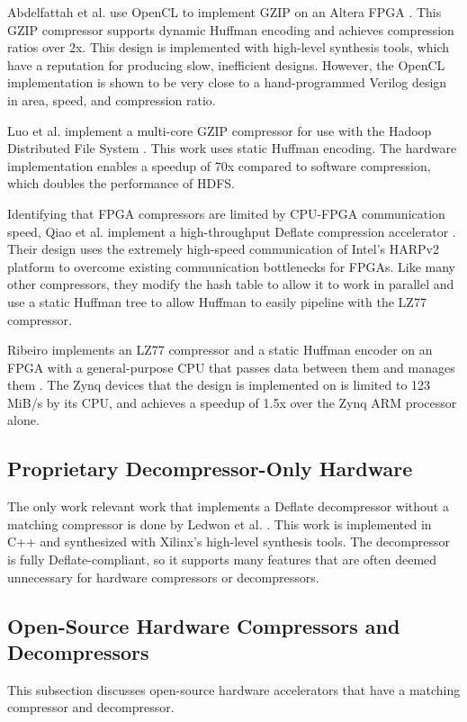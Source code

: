 \documentclass[doublespace,nopageskip]{VTthesis}
\begin{document}
Abdelfattah et al. use OpenCL to implement GZIP on an Altera FPGA \cite{gziponachip}. This GZIP compressor supports dynamic Huffman encoding and achieves compression ratios over 2x. This design is implemented with high-level synthesis tools, which have a reputation for producing slow, inefficient designs. However, the OpenCL implementation is shown to be very close to a hand-programmed Verilog design in area, speed, and compression ratio.

Luo et al. implement a multi-core GZIP compressor for use with the Hadoop Distributed File System \cite{hdfsgzip}. This work uses static Huffman encoding. The hardware implementation enables a speedup of 70x compared to software compression, which doubles the performance of HDFS.

Identifying that FPGA compressors are limited by CPU-FPGA communication speed, Qiao et al. implement a high-throughput Deflate compression accelerator \cite{fpgadeflate}. Their design uses the extremely high-speed communication of Intel's HARPv2 platform to overcome existing communication bottlenecks for FPGAs. Like many other compressors, they modify the hash table to allow it to work in parallel and use a static Huffman tree to allow Huffman to easily pipeline with the LZ77 compressor.

Ribeiro implements an LZ77 compressor and a static Huffman encoder on an FPGA with a general-purpose CPU that passes data between them and manages them \cite{ribeiro}. The Zynq devices that the design is implemented on is limited to 123 MiB/s by its CPU, and achieves a speedup of 1.5x over the Zynq ARM processor alone.

\subsection{Proprietary Decompressor-Only Hardware}\label{ss:proprietary_decompressor-only_hardware}
The only work relevant work that implements a Deflate decompressor without a matching compressor is done by Ledwon et al. \cite{deflatedecompression}. This work is implemented in C++ and synthesized with Xilinx's high-level synthesis tools. The decompressor is fully Deflate-compliant, so it supports many features that are often deemed unnecessary for hardware compressors or decompressors.

\subsection{Open-Source Hardware Compressors and Decompressors}\label{ss:open-source_hardware_compressors_and_decompressors}
This subsection discusses open-source hardware accelerators that have a matching compressor and decompressor.
\end{document}
